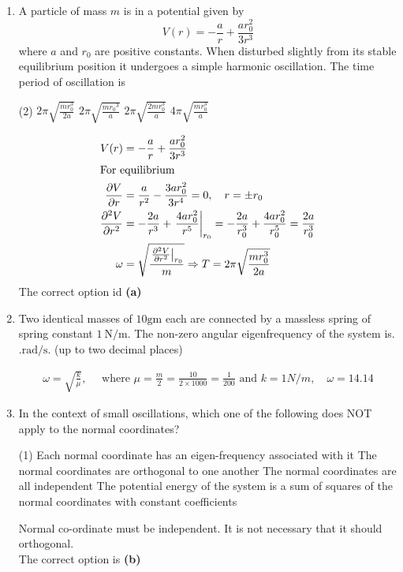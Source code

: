 \begin{enumerate}
	\item A particle of mass $m$ is in a potential given by
	$$
	V(r)=-\frac{a}{r}+\frac{a r_{0}^{2}}{3 r^{3}}
	$$
	where $a$ and $r_{0}$ are positive constants. When disturbed slightly from its stable equilibrium position it undergoes a simple harmonic oscillation. The time period of oscillation is
	{}
\begin{tasks}(2)
	\task[\textbf{A.}] $2 \pi \sqrt{\frac{m r_{0}^{3}}{2 a}}$
	\task[\textbf{B.}]$2 \pi \sqrt{\frac{m r_{0}{ }^{3}}{a}}$
	\task[\textbf{C.}]$2 \pi \sqrt{\frac{2 m r_{0}^{3}}{a}}$
	\task[\textbf{D.}]$4 \pi \sqrt{\frac{m r_{0}^{3}}{a}}$
\end{tasks}
\begin{answer}
\begin{align*}
V(r)&=-\frac{a}{r}+\frac{a r_{0}^{2}}{3 r^{3}}\\
\intertext{For equilibrium}
\frac{\partial V}{\partial r}&=\frac{a}{r^{2}}-\frac{3 a r_{0}^{2}}{3 r^{4}}=0, \quad r=\pm r_{0}\\
\frac{\partial^{2} V}{\partial r^{2}}&=-\frac{2 a}{r^{3}}+\left.\frac{4 a r_{0}^{2}}{r^{5}}\right|_{r_{0}}=-\frac{2 a}{r_{0}^{3}}+\frac{4 a r_{0}^{2}}{r_{0}^{5}}=\frac{2 a}{r_{0}^{3}}\\
\omega&=\sqrt{\frac{\left.\frac{\partial^{2} V}{\partial r^{2}}\right|_{r_{0}}}{m}} \Rightarrow T=2 \pi \sqrt{\frac{m r_{0}^{3}}{2 a}}
\end{align*}
The correct option id \textbf{(a)}
\end{answer}
	\item Two identical masses of $10 \mathrm{gm}$ each are connected by a massless spring of spring constant $1 \mathrm{~N} / \mathrm{m}$. The non-zero angular eigenfrequency of the system is. $. \mathrm{rad} / \mathrm{s} .$ (up to two decimal places)
	{}
\begin{answer}
\begin{align*}
\omega=\sqrt{\frac{k}{\mu}}, \quad \text { where } \mu=\frac{m}{2}=\frac{10}{2 \times 1000}=\frac{1}{200} \text { and } k=1 N / m, \quad \omega=14.14
\end{align*}
\end{answer}
	\item In the context of small oscillations, which one of the following does NOT apply to the normal coordinates?
{	}
\begin{tasks}(1)
	\task[\textbf{A.}] Each normal coordinate has an eigen-frequency associated with it
	\task[\textbf{B.}]The normal coordinates are orthogonal to one another
	\task[\textbf{C.}]The normal coordinates are all independent
	\task[\textbf{D.}]The potential energy of the system is a sum of squares of the normal coordinates with constant coefficients
\end{tasks}
\begin{answer}
 Normal co-ordinate must be independent. It is not necessary that it should orthogonal.\\
 The correct option is \textbf{(b)}	
\end{answer}

\end{enumerate}